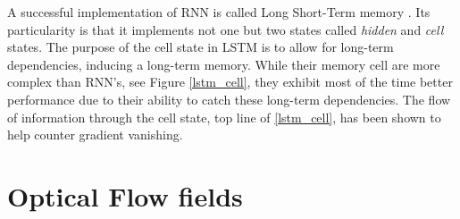 \documentclass[12pt, a4paper]{report}
\begin{document}
		\par
		A successful implementation of RNN is called Long Short-Term memory \cite{Hochreiter1997lstm}.
		Its particularity is that it implements not one but two states called {\itshape hidden} and {\itshape cell} states.
		The purpose of the cell state in LSTM is to allow for long-term dependencies, inducing a long-term memory.
		While their memory cell are more complex than RNN's, see Figure \ref{lstm_cell}, they exhibit most of the time better performance due to their ability to catch these long-term dependencies.
		The flow of information through the cell state, top line of \ref{lstm_cell}, has been shown to help counter gradient vanishing.
	\chapter{Optical Flow fields}\label{appendix_c}
	\makeutbmbackcover{}
\end{document}
